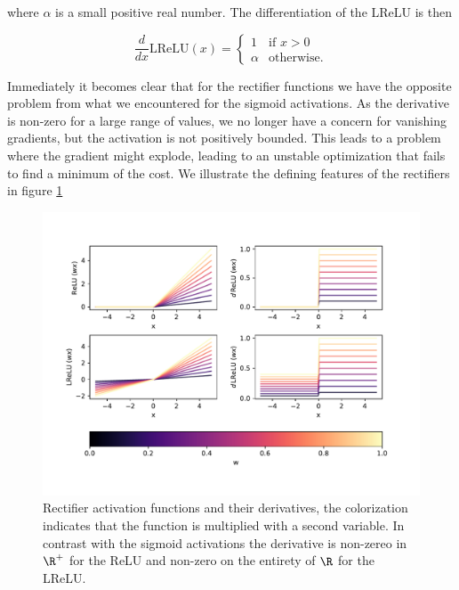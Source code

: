\noindent where $\alpha$ is a small positive real number. The differentiation of the LReLU is then 

\begin{equation}\label{eq:lrelu}
    \frac{d}{dx}\text{LReLU} (x) = \begin{cases}
    1 & \text{if } x > 0 \\
    \alpha & \text{otherwise}.
    \end{cases}
\end{equation}

\noindent Immediately it becomes clear that for the rectifier functions we have the opposite problem from what we encountered for the sigmoid activations. As the derivative is non-zero for a large range of values, we no longer have a concern for vanishing gradients, but the activation is not positively bounded. This leads to a problem where the gradient might explode, leading to an unstable optimization that fails to find a minimum of the cost. We illustrate the defining features of the rectifiers in figure \ref{fig:elu}

\begin{figure}
\centering
\includegraphics[width=\textwidth]{../figures/activationselus.pdf}
\caption[Rectifier activation functions]{Rectifier activation functions and their derivatives, the colorization indicates that the function is multiplied with a second variable. In contrast with the sigmoid activations the derivative is non-zereo in $\R^+$ for the ReLU and non-zero on the entirety of $\R$ for the LReLU.}\label{fig:elu}
\end{figure}

